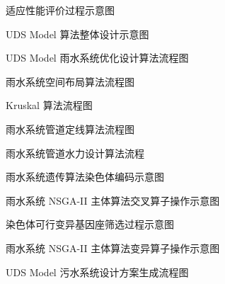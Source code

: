 \documentclass[degree=doctor]{thuthesis}
\begin{document}
\clearpage
\setcounter{page}{83}
\begin{figure}
  \centering
  \caption{适应性能评价过程示意图}
\end{figure}

\clearpage
\setcounter{page}{91}
\begin{figure}
  \centering
  \caption{UDS Model 算法整体设计示意图}
\end{figure}

\clearpage
\setcounter{page}{93}
\begin{figure}
  \centering
  \caption{UDS Model 雨水系统优化设计算法流程图}
\end{figure}

\clearpage
\setcounter{page}{94}
\begin{figure}
  \centering
  \caption{雨水系统空间布局算法流程图}
\end{figure}

\begin{figure}
  \centering
  \caption{Kruskal 算法流程图}
\end{figure}

\clearpage
\setcounter{page}{95}
\begin{figure}
  \centering
  \caption{雨水系统管道定线算法流程图}
\end{figure}

\begin{figure}
  \centering
  \caption{雨水系统管道水力设计算法流程}
\end{figure}

\clearpage
\setcounter{page}{97}
\begin{figure}
  \centering
  \caption{雨水系统遗传算法染色体编码示意图}
\end{figure}

\begin{figure}
  \centering
  \caption{雨水系统 NSGA-II 主体算法交叉算子操作示意图}
\end{figure}

\clearpage
\setcounter{page}{98}
\begin{figure}
  \centering
  \caption{染色体可行变异基因座筛选过程示意图}
\end{figure}

\begin{figure}
  \centering
  \caption{雨水系统 NSGA-II 主体算法变异算子操作示意图}
\end{figure}

\clearpage
\setcounter{page}{100}
\begin{figure}
  \centering
  \caption{UDS Model 污水系统设计方案生成流程图}
\end{figure}
\end{document}
